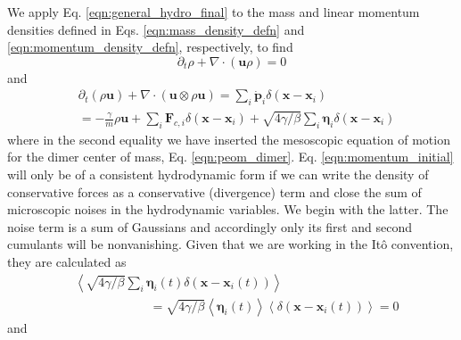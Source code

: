 \documentclass[%
 reprint,
superscriptaddress,
longbibliography,
 amsmath,amssymb,
 prl,
 citeautoscript,
]{revtex4-1}
\begin{document}
We apply Eq. \ref{eqn:general_hydro_final} to the mass and linear momentum densities defined in Eqs. \ref{eqn:mass_density_defn} and \ref{eqn:momentum_density_defn}, respectively, to find
\begin{equation}
\partial_t \rho + \nabla \cdot \left( {\boldsymbol u} \rho \right) = 0
\label{eqn:continuity_initial}
\end{equation}
and
\begin{equation}
\begin{split}
&\partial_t \left( \rho {\boldsymbol u} \right) + \nabla \cdot \left( {\boldsymbol u} \otimes \rho {\boldsymbol u} \right) = \sum_i \dot{\boldsymbol p}_i \delta \left( {\boldsymbol x} - {\boldsymbol x}_i \right) \\
&= - \frac{\gamma}{m} \rho {\boldsymbol u} + \sum_i {\boldsymbol F}_{c,i} \delta \left( {\boldsymbol x} - {\boldsymbol x}_i \right) + \sqrt{4 \gamma / \beta} \sum_i {\boldsymbol \eta}_i \delta \left( {\boldsymbol x} - {\boldsymbol x}_i \right)
\end{split}
\label{eqn:momentum_initial}
\end{equation}
where in the second equality we have inserted the mesoscopic equation of motion for the dimer center of mass, Eq. \ref{eqn:peom_dimer}. Eq. \ref{eqn:momentum_initial} will only be of a consistent hydrodynamic form if we can write the density of conservative forces as a conservative (divergence) term and close the sum of microscopic noises in the hydrodynamic variables. We begin with the latter. The noise term is a sum of Gaussians and accordingly only its first and second cumulants will be nonvanishing. Given that we are working in the It\^{o} convention, they are calculated as \cite{dean}
\[
\begin{split}
&\left\langle \sqrt{4 \gamma / \beta} \sum_i {\boldsymbol \eta}_i(t) \delta \left( {\boldsymbol x} - {\boldsymbol x}_i(t) \right) \right\rangle \\
&\quad \quad \quad \quad \quad \quad = \sqrt{4 \gamma / \beta} \left\langle {\boldsymbol \eta}_i (t) \right\rangle \left\langle \delta \left( {\boldsymbol x} - {\boldsymbol x}_i(t) \right) \right\rangle = 0
\end{split}
\label{eqn:first_cumulant}
\]
and
\end{document}
